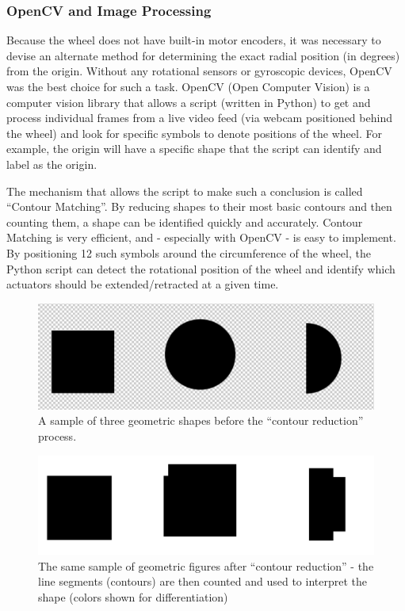 \documentclass[12pt]{article}
\numberwithin{figure}{section}
\begin{document}
\begin{multicols}{2}
\subsubsection{OpenCV and Image Processing}
Because the wheel does not have built-in motor encoders, it was necessary to devise an alternate method for determining the exact radial position (in degrees) from the origin. Without any rotational sensors or gyroscopic devices, OpenCV was the best choice for such a task. OpenCV (Open Computer Vision) is a computer vision library that allows a script (written in Python) to get and process individual frames from a live video feed (via webcam positioned behind the wheel) and look for specific symbols to denote positions of the wheel. For example, the origin will have a specific shape that the script can identify and label as the origin.

The mechanism that allows the script to make such a conclusion is called “Contour Matching”. By reducing shapes to their most basic contours and then counting them, a shape can be identified quickly and accurately. Contour Matching is very efficient, and - especially with OpenCV - is easy to implement. By positioning 12 such symbols around the circumference of the wheel, the Python script can detect the rotational position of the wheel and identify which actuators should be extended/retracted at a given time.

\begin{figure}[H]
\includegraphics[scale=0.15]{OpenCV_Part_1.png}
\caption{A sample of three geometric shapes before the “contour reduction” process.}
\label{fig:final_design}
\end{figure}

\begin{figure}[H]
\includegraphics[scale=0.15]{OpenCV_Part_2.png}
\caption{The same sample of geometric figures after “contour reduction” - the line segments (contours) are then counted and used to interpret the shape (colors shown for differentiation)}
\label{fig:final_design}
\end{figure}


\end{multicols}
\end{document}
